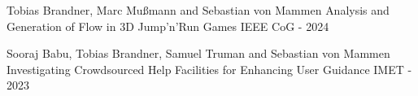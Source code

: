 

\begin{cventries}

  \cventry
    {Tobias Brandner, Marc Mußmann and Sebastian von Mammen} %
    {Analysis and Generation of Flow in 3D Jump'n'Run Games} %
    {{\href{https://ieeexplore.ieee.org/abstract/document/10645536}{\faFilePdfO}}} %
    {IEEE CoG - 2024} %
    {}

  \cventry
    {Sooraj Babu, Tobias Brandner, Samuel Truman and Sebastian von Mammen} %
    {Investigating Crowdsourced Help Facilities for Enhancing User Guidance} %
    {{\href{https://diglib.eg.org/server/api/core/bitstreams/f635ab29-9038-4e8f-8563-89c7def8902f/content}{\faFilePdfO}}} %
    {IMET - 2023} %
    {}

\end{cventries}
